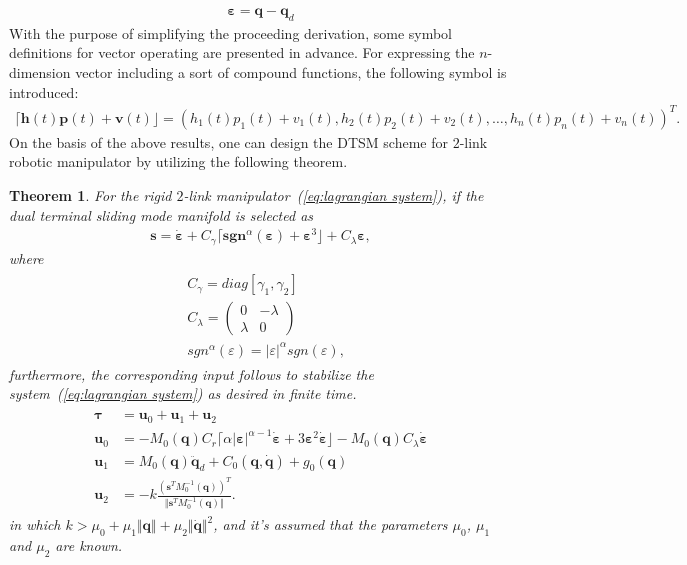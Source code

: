 \documentclass[3p]{elsarticle}
\theoremstyle{plain}
\newtheorem{mythm}{Theorem}
\theoremstyle{remark}
\begin{document}
\begin{align}
\bm \varepsilon = \bm q -\bm q_d
\end{align}
With the purpose of simplifying the proceeding derivation, some symbol definitions for vector operating are presented in advance. For expressing the $n$-dimension vector including a sort of compound functions, the following symbol is introduced:
\begin{align*}
\lceil\bm h(t)\bm p(t)+\bm v(t)\rfloor = (h_1(t)p_1(t)+v_1(t),h_2(t)p_2(t)+v_2(t),\ldots,h_n(t)p_n(t)+v_n(t))^T.
\end{align*}
On the basis of the above results, one can design the DTSM scheme for $2$-link robotic manipulator by utilizing the following theorem.
\begin{mythm}\label{theorem:4}
For the rigid $2$-link manipulator~(\ref{eq:lagrangian system}), if the dual terminal sliding mode manifold is selected as
\begin{align}
\bm s = \dot{\bm \varepsilon}+C_\gamma\lceil\bm{sgn}^\alpha(\bm \varepsilon)+\bm\varepsilon^3\rfloor+C_\lambda{\bm\varepsilon},\label{eq:lagrangian manifold}
\end{align}
where
\begin{align}
\begin{split}
&C_\gamma=diag[\gamma_1,\gamma_2]\\
&C_\lambda=
\begin{pmatrix}
0 &-\lambda\\ \lambda &0
\end{pmatrix}\\
&{sgn}^\alpha(\varepsilon)=\vert\varepsilon\vert^\alpha sgn(\varepsilon),
\end{split}
\end{align}
furthermore, the corresponding input follows to stabilize the system~(\ref{eq:lagrangian system}) as desired in finite time.
\begin{align}
\begin{split}
\bm\tau &= \bm u_0+\bm u_1 +\bm u_2\\
\bm u_0 &= -M_0(\bm q)C_r\lceil\alpha\vert\bm\varepsilon\vert^{\alpha-1}\dot{\bm \varepsilon}+3\bm \varepsilon^2\dot{\bm \varepsilon}\rfloor-M_0(\bm q)C_\lambda\dot{\bm \varepsilon}\\
\bm u_1 &= M_0(\bm q)\ddot {\bm q}_d+C_0(\bm q,\dot {\bm q})+g_0(\bm q)\\
\bm u_2 &= -k\frac{(\bm s^TM_0^{-1}(\bm q))^T}{\Vert\bm s^TM_0^{-1}(\bm q)\Vert}.
\end{split}
\end{align}
in which $k>\mu_0+\mu_1\Vert\bm q\Vert+\mu_2\Vert\dot{\bm q}\Vert^2$, and it's assumed that the parameters $\mu_0$, $\mu_1$ and $\mu_2$ are known.
\end{mythm}
\end{document}

